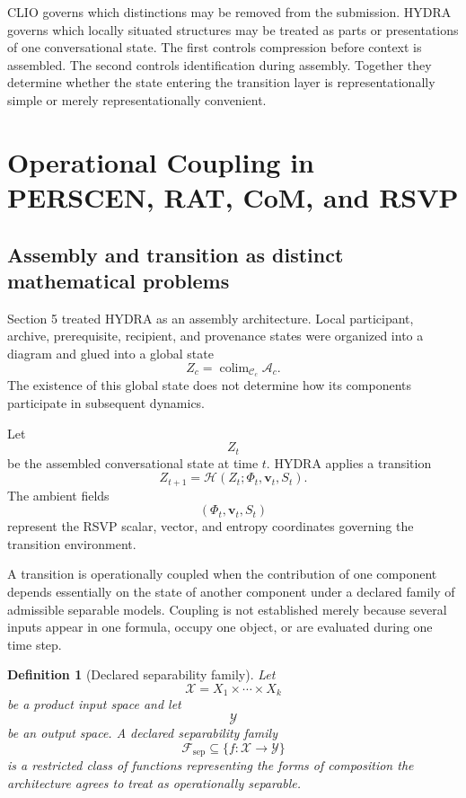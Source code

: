 \documentclass[11pt]{article}
\newtheorem{definition}{Definition}[section]
\theoremstyle{definition}
\DeclareMathOperator{\colim}{colim}
\newcommand{\F}{\mathcal{F}}
\newcommand{\C}{\mathcal{C}}
\newcommand{\A}{\mathcal{A}}
\newcommand{\Hh}{\mathcal{H}}
\newcommand{\FieldPhi}{\Phi}
\newcommand{\FieldV}{\mathbf{v}}
\newcommand{\FieldS}{S}
\begin{document}
CLIO governs which distinctions may be removed from the submission. HYDRA governs which locally situated structures may be treated as parts or presentations of one conversational state. The first controls compression before context is assembled. The second controls identification during assembly. Together they determine whether the state entering the transition layer is representationally simple or merely representationally convenient.

\section{Operational Coupling in PERSCEN, RAT, CoM, and RSVP}

\subsection{Assembly and transition as distinct mathematical problems}

Section 5 treated HYDRA as an assembly architecture. Local participant, archive, prerequisite, recipient, and provenance states were organized into a diagram and glued into a global state
\[
Z_c
=
\colim_{\C_c}\A_c.
\]
The existence of this global state does not determine how its components participate in subsequent dynamics.

Let
\[
Z_t
\]
be the assembled conversational state at time \(t\). HYDRA applies a transition
\[
Z_{t+1}
=
\Hh
\left(
Z_t;
\FieldPhi_t,
\FieldV_t,
\FieldS_t
\right).
\]
The ambient fields
\[
(\FieldPhi_t,\FieldV_t,\FieldS_t)
\]
represent the RSVP scalar, vector, and entropy coordinates governing the transition environment.

A transition is operationally coupled when the contribution of one component depends essentially on the state of another component under a declared family of admissible separable models. Coupling is not established merely because several inputs appear in one formula, occupy one object, or are evaluated during one time step.

\begin{definition}[Declared separability family]
Let
\[
\mathcal X
=
X_1\times\cdots\times X_k
\]
be a product input space and let
\[
\mathcal Y
\]
be an output space. A declared separability family
\[
\F_{\mathrm{sep}}
\subseteq
\{f:\mathcal X\to\mathcal Y\}
\]
is a restricted class of functions representing the forms of composition the architecture agrees to treat as operationally separable.
\end{definition}
\end{document}
